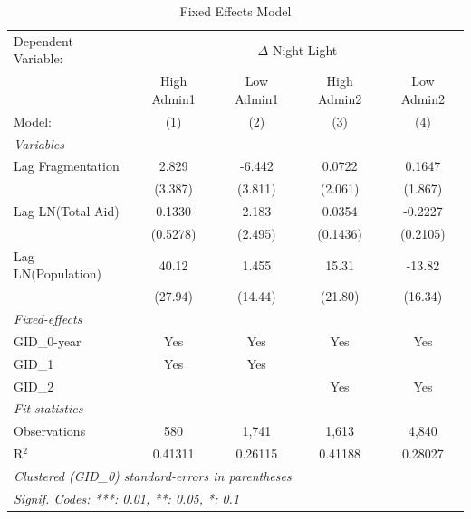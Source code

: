 
\begin{table}[htbp]
\centering
\caption{Fixed Effects Model}
\label{tab:fe_results}
\begin{tabular}{lcccc}
   \tabularnewline \midrule \midrule
   Dependent Variable: & \multicolumn{4}{c}{$\Delta$ Night Light}\\
                      & High Admin1 & Low Admin1 & High Admin2 & Low Admin2 \\   
   Model:             & (1)         & (2)        & (3)         & (4)\\  
   \midrule
   \emph{Variables}\\
   Lag Fragmentation       & 2.829       & -6.442     & 0.0722      & 0.1647\\   
                      & (3.387)     & (3.811)    & (2.061)     & (1.867)\\   
   Lag LN(Total Aid)  & 0.1330      & 2.183      & 0.0354      & -0.2227\\   
                      & (0.5278)    & (2.495)    & (0.1436)    & (0.2105)\\   
   Lag LN(Population) & 40.12       & 1.455      & 15.31       & -13.82\\   
                      & (27.94)     & (14.44)    & (21.80)     & (16.34)\\   
   \midrule
   \emph{Fixed-effects}\\
   GID\_0-year        & Yes         & Yes        & Yes         & Yes\\  
   GID\_1             & Yes         & Yes        &             & \\  
   GID\_2             &             &            & Yes         & Yes\\  
   \midrule
   \emph{Fit statistics}\\
   Observations       & 580         & 1,741      & 1,613       & 4,840\\  
   R$^2$              & 0.41311     & 0.26115    & 0.41188     & 0.28027\\  
   \midrule \midrule
   \multicolumn{5}{l}{\emph{Clustered (GID\_0) standard-errors in parentheses}}\\
   \multicolumn{5}{l}{\emph{Signif. Codes: ***: 0.01, **: 0.05, *: 0.1}}\\
\end{tabular}
\end{table}


